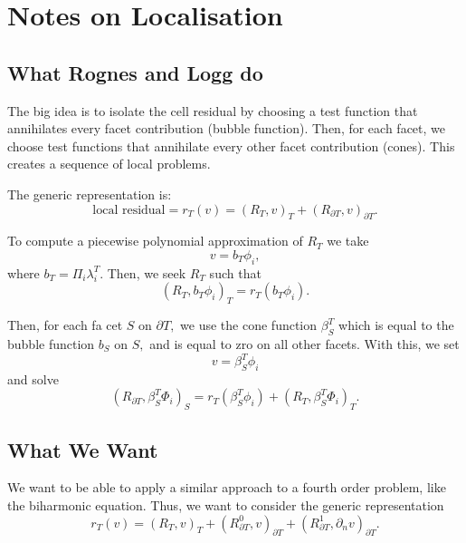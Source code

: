 \documentclass[12pt,a4paper]{article}
\begin{document}
\section{Notes on Localisation}

\subsection{What Rognes and Logg do}

The big idea is to isolate the cell residual by choosing a test function that annihilates every facet contribution (bubble function). Then, for each facet, we choose test functions that annihilate every other facet contribution (cones). This creates a sequence of local problems. 

The generic representation is:
\begin{equation}
    \text{local residual} = r_T(v) =  (R_T, v)_T + (R_{\partial T}, v)_{\partial T}.  
\end{equation}

To compute a piecewise polynomial approximation of $R_T$ we take 
\begin{equation}
    v = b_T \phi_i,
\end{equation}
where $b_T = \Pi_{i} \lambda_i^T.$
Then, we seek $R_T$ such that 
\begin{equation}
    (R_T, b_T \phi_i)_T = r_T(b_T\phi_i).
\end{equation}


Then, for each fa cet $S$ on $\partial T,$ we use the cone function $\beta_S^T$ which is equal to the bubble function $b_S$ on $S,$ and is equal to zro on all other facets. With this, we set 
\begin{equation}
    v = \beta_S^T \phi_i
\end{equation}
and solve
\begin{equation}
(R_{\partial T}, \beta_S^T \Phi_i)_S = r_T(\beta_S^T \phi_i) + (R_T, \beta_S^T\Phi_i)_T.
\end{equation}


\subsection{What We Want} 

We want to be able to apply a similar approach to a fourth order problem, like the biharmonic equation. Thus, we want to consider the generic representation
\begin{equation}
    r_T(v) = (R_T, v)_T + (R_{\partial T}^0, v)_{\partial T} + (R_{\partial T}^1, \partial_n v)_{\partial T}. 
\end{equation}
\end{document}
